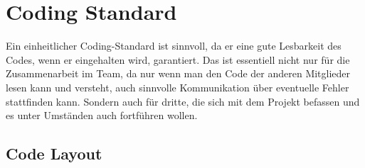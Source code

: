 
\section{Coding Standard}
Ein einheitlicher Coding-Standard ist sinnvoll, da er eine gute Lesbarkeit des Codes, wenn er eingehalten wird, garantiert. Das ist essentiell nicht nur für die Zusammenarbeit im Team, da nur wenn man den Code der anderen Mitglieder lesen kann und versteht, auch sinnvolle Kommunikation über eventuelle Fehler stattfinden kann. Sondern auch für dritte, die sich mit dem Projekt befassen und es unter Umständen auch fortführen wollen.

\subsection{Code Layout}

